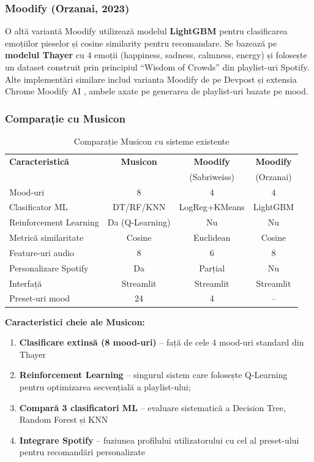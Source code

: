 \documentclass[12pt,a4paper]{article}
\begin{document}
\subsubsection{Moodify (Orzanai, 2023)}

O altă variantă Moodify \cite{moodify2023} utilizează modelul \textbf{LightGBM} pentru clasificarea emoțiilor pieselor și cosine similarity pentru recomandare. Se bazează pe \textbf{modelul Thayer} cu 4 emoții (happiness, sadness, calmness, energy) și folosește un dataset construit prin principiul ``Wisdom of Crowds'' din playlist-uri Spotify. Alte implementări similare includ varianta Moodify de pe Devpost \cite{moodify2024devpost} și extensia Chrome Moodify AI \cite{moodify2024chrome}, ambele axate pe generarea de playlist-uri bazate pe mood.

\subsubsection{Comparație cu Musicon}

\begin{table}[H]
\centering
\caption{Comparație Musicon cu sisteme existente}
\label{tab:comparison}
\small
\begin{tabular}{lccc}
\toprule
\textbf{Caracteristică} & \textbf{Musicon} & \textbf{Moodify} & \textbf{Moodify} \\
 & & \scriptsize{(Sabriweiss)} & \scriptsize{(Orzanai)} \\
\midrule
Mood-uri              & 8   & 4             & 4      \\
Clasificator ML       & DT/RF/KNN & LogReg+KMeans & LightGBM \\
Reinforcement Learning & Da (Q-Learning) & Nu    & Nu     \\
Metrică similaritate  & Cosine        & Euclidean     & Cosine   \\
Feature-uri audio     & 8   & 6             & 8         \\
Personalizare Spotify & Da  & Parțial       & Nu        \\
Interfață             & Streamlit     & Streamlit     & Streamlit \\
Preset-uri mood       & 24  & 4             & --        \\
\bottomrule
\end{tabular}
\end{table}

\textbf{Caracteristici cheie ale Musicon:}
\begin{enumerate}
    \item \textbf{Clasificare extinsă (8 mood-uri)} -- față de cele 4 mood-uri standard din Thayer
    \item \textbf{Reinforcement Learning} -- singurul sistem care folosește Q-Learning pentru optimizarea secvențială a playlist-ului;
    \item \textbf{Compară 3 clasificatori ML} -- evaluare sistematică a Decision Tree, Random Forest și KNN
    \item \textbf{Integrare Spotify} -- fuziunea profilului utilizatorului cu cel al preset-ului pentru recomandări personalizate
\end{enumerate}
\end{document}
